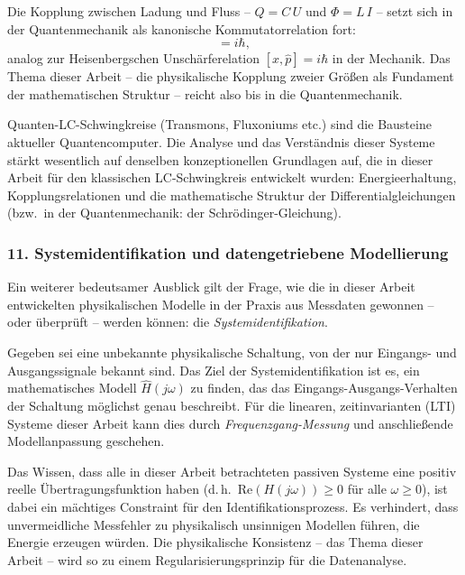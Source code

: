 ﻿\documentclass[12pt, a4paper]{article}
\begin{document}
	Die Kopplung zwischen Ladung und Fluss -- $Q = C\,U$ und $\Phi = L\,I$ -- setzt sich in der Quantenmechanik als kanonische Kommutatorrelation fort:
	\begin{equation}
		[\hat{\Phi}, \hat{Q}] = i\hbar,
	\end{equation}
	analog zur Heisenbergschen Unschärferelation $[\hat{x}, \hat{p}] = i\hbar$ in der Mechanik. Das Thema dieser Arbeit -- die physikalische Kopplung zweier Größen als Fundament der mathematischen Struktur -- reicht also bis in die Quantenmechanik.

	Quanten-LC-Schwingkreise (Transmons, Fluxoniums etc.) sind die Bausteine aktueller Quantencomputer. Die Analyse und das Verständnis dieser Systeme stärkt wesentlich auf denselben konzeptionellen Grundlagen auf, die in dieser Arbeit für den klassischen LC-Schwingkreis entwickelt wurden: Energieerhaltung, Kopplungsrelationen und die mathematische Struktur der Differentialgleichungen (bzw.\ in der Quantenmechanik: der Schrödinger-Gleichung).

	\subsubsection*{11. \quad Systemidentifikation und datengetriebene Modellierung}

	Ein weiterer bedeutsamer Ausblick gilt der Frage, wie die in dieser Arbeit entwickelten physikalischen Modelle in der Praxis aus Messdaten gewonnen -- oder überprüft -- werden können: die \textit{Systemidentifikation}.

	Gegeben sei eine unbekannte physikalische Schaltung, von der nur Eingangs- und Ausgangssignale bekannt sind. Das Ziel der Systemidentifikation ist es, ein mathematisches Modell $\hat{H}(j\omega)$ zu finden, das das Eingangs-Ausgangs-Verhalten der Schaltung möglichst genau beschreibt. Für die linearen, zeitinvarianten (LTI) Systeme dieser Arbeit kann dies durch \textit{Frequenzgang-Messung} und anschließende Modellanpassung geschehen.

	Das Wissen, dass alle in dieser Arbeit betrachteten passiven Systeme eine positiv reelle Übertragungsfunktion haben (d.\,h.\ $\mathrm{Re}(H(j\omega)) \geq 0$ für alle $\omega \geq 0$), ist dabei ein mächtiges Constraint für den Identifikationsprozess. Es verhindert, dass unvermeidliche Messfehler zu physikalisch unsinnigen Modellen führen, die Energie erzeugen würden. Die physikalische Konsistenz -- das Thema dieser Arbeit -- wird so zu einem Regularisierungsprinzip für die Datenanalyse.
\end{document}
